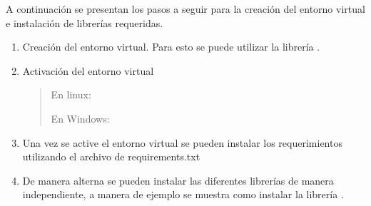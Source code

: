 \documentclass[letterpaper,10pt,openany,spanish]{sphinxmanual}
\begin{document}
A continuación se presentan los pasos a seguir para la creación del entorno virtual e instalación de librerías requeridas.
\begin{enumerate}
%
\item {} 
Creación del entorno virtual. Para esto se puede utilizar la librería .
\begin{quote}

\begin{sphinxVerbatim}[commandchars=\\\{\}]
\end{sphinxVerbatim}
\end{quote}

\item {} 
Activación del entorno virtual
\begin{quote}

En linux:

\begin{sphinxVerbatim}[commandchars=\\\{\}]
\end{sphinxVerbatim}

En Windows:

\begin{sphinxVerbatim}[commandchars=\\\{\}]
\end{sphinxVerbatim}
\end{quote}

\item {} 
Una vez se active el entorno virtual se pueden instalar los requerimientos utilizando el archivo de requirements.txt
\begin{quote}

\begin{sphinxVerbatim}[commandchars=\\\{\}]
\end{sphinxVerbatim}
\end{quote}

\item {} 
De manera alterna se pueden instalar las diferentes librerías de manera independiente, a manera de ejemplo se muestra como instalar la librería .
\begin{quote}

\begin{sphinxVerbatim}[commandchars=\\\{\}]
\end{sphinxVerbatim}
\end{quote}


\end{enumerate}
\end{document}
